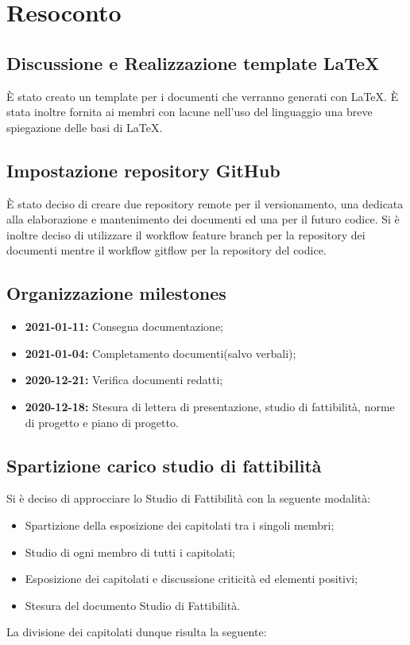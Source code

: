 \newpage


\section{Resoconto}

\subsection{Discussione e Realizzazione template \LaTeX}

È stato creato un template per i documenti che verranno generati con \LaTeX. È stata inoltre fornita ai membri con lacune nell'uso del linguaggio una breve spiegazione delle basi di \LaTeX.

\subsection{Impostazione repository GitHub}

È stato deciso di creare due repository remote per il versionamento, una dedicata alla elaborazione e mantenimento dei documenti ed una per il futuro codice. Si è inoltre deciso di utilizzare il workflow feature branch per la repository dei documenti mentre il workflow gitflow per la repository del codice.

\subsection{Organizzazione milestones}

\begin{itemize}

	\item \textbf{2021-01-11:} Consegna documentazione;
	\item \textbf{2021-01-04:} Completamento documenti(salvo verbali);
	\item \textbf{2020-12-21:} Verifica documenti redatti;
	\item \textbf{2020-12-18:} Stesura di lettera di presentazione, studio di fattibilità, norme di progetto e piano di progetto.
	
\end{itemize}

\subsection{Spartizione carico studio di fattibilità}

Si è deciso di approcciare lo Studio di Fattibilità con la seguente modalità: 
\begin{itemize}
	\item Spartizione della esposizione dei capitolati tra i singoli membri;
	\item Studio di ogni membro di tutti i capitolati;
	\item Esposizione dei capitolati e discussione criticità ed elementi positivi;
	\item Stesura del documento Studio di Fattibilità.
\end{itemize}
La divisione dei capitolati dunque risulta la seguente:

